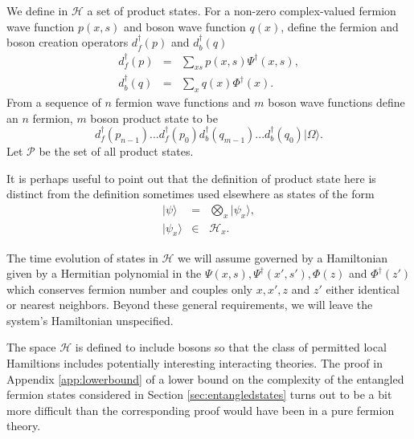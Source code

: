 \documentclass[twocolumn,amsmath,amssymb]{revtex4-1}
\begin{document}
We define in $\mathcal{H}$ a set of product states.
For a non-zero complex-valued fermion wave function $p(x, s)$ and
boson wave function $q(x)$,  define the fermion
and boson
creation operators $d_f^\dagger( p)$ and $d_b^\dagger( q)$
\begin{subequations}
\begin{eqnarray}
\label{extended}
d_f^\dagger( p) &=& \sum_{x s} p(x, s)\Psi^\dagger( x, s), \\
\label{extendedb}
d_b^\dagger( q) &=& \sum_x q(x) \Phi^\dagger( x).
\end{eqnarray}
\end{subequations}
From a sequence of $n$ fermion wave functions and $m$ boson wave functions
define an $n$ fermion, $m$ boson product state to be
\begin{equation}
\label{productstate}
d_f^\dagger( p_{n-1}) ... d_f^\dagger( p_0)d_b^\dagger( q_{m-1}) ... d_b^\dagger( q_0) |\Omega \rangle .
\end{equation}
Let $\mathcal{P}$ be the set of all product states.


It is perhaps useful to point out that the definition of product state
here is distinct from the definition sometimes
used elsewhere as states of the form
\begin{subequations}
 \begin{eqnarray}
  \label{separable}
  |\psi \rangle  &=& \bigotimes_x |\psi_x \rangle , \\
  \label{separable1}
  |\psi_x \rangle  & \in & \mathcal{H}_x.
 \end{eqnarray}
\end{subequations}

 


The time evolution of states in $\mathcal{H}$ we will assume
governed by a Hamiltonian given by a Hermitian polynomial
in the $\Psi( x, s), \Psi^\dagger( x', s'),\Phi( z)$ and $\Phi^\dagger( z')$ which conserves fermion number
and couples only $x, x', z$ and $z'$ either identical or nearest neighbors.
Beyond these general requirements, we will leave the system's
Hamiltonian unspecified.

The space $\mathcal{H}$ is defined to include bosons so that the
class of permitted local Hamiltions includes potentially
interesting interacting theories. The proof in Appendix \ref{app:lowerbound}
of a lower
bound on the complexity of the entangled fermion states
considered in Section \ref{sec:entangledstates} turns
out to be a bit more difficult than the corresponding
proof would have been in a pure fermion theory.
\end{document}
